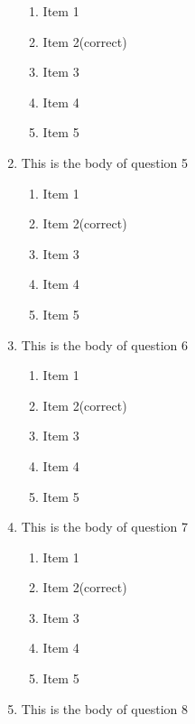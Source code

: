\documentclass[amsfonts,bezier,leqno,fleqn,12pt,a4paper]{article}
\begin{document}
\begin{large}
\begin{enumerate}
\begin{enumerate}
\item Item 1
\item Item 2\hfill {\small (correct)}
\item Item 3
\item Item 4
\item Item 5

\end{enumerate}
\newpage


\item This is the body of question 5
\vspace {0.3in}
\setcounter{equation}{0}

\begin{enumerate}
\item Item 1
\item Item 2\hfill {\small (correct)}
\item Item 3
\item Item 4
\item Item 5

\end{enumerate}

\vspace {3.5cm}


\item This is the body of question 6
\vspace {0.3in}
\setcounter{equation}{0}

\begin{enumerate}
\item Item 1
\item Item 2\hfill {\small (correct)}
\item Item 3
\item Item 4
\item Item 5

\end{enumerate}
\newpage


\item This is the body of question 7
\vspace {0.3in}
\setcounter{equation}{0}

\begin{enumerate}
\item Item 1
\item Item 2\hfill {\small (correct)}
\item Item 3
\item Item 4
\item Item 5

\end{enumerate}

\vspace {3.5cm}


\item This is the body of question 8
\vspace {0.3in}
\setcounter{equation}{0}


\end{enumerate}
\end{large}
\end{document}
